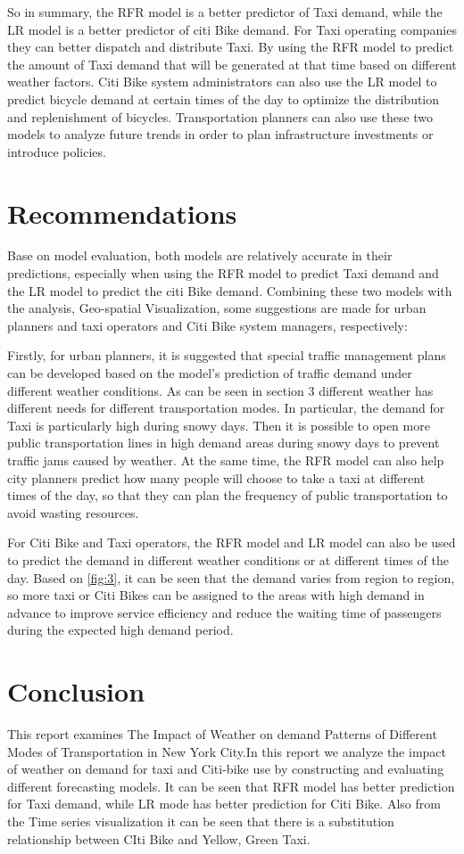 \documentclass[11pt]{article}
\begin{document}
So in summary, the RFR model is a better predictor of Taxi demand, while the LR model is a better predictor of citi Bike demand. For Taxi operating companies they can better dispatch and distribute Taxi. By using the RFR model to predict the amount of Taxi demand that will be generated at that time based on different weather factors. Citi Bike system administrators can also use the LR model to predict bicycle demand at certain times of the day to optimize the distribution and replenishment of bicycles. Transportation planners can also use these two models to analyze future trends in order to plan infrastructure investments or introduce policies.

\section{Recommendations}
Base on model evaluation, both models are relatively accurate in their predictions, especially when using the RFR model to predict Taxi demand and the LR model to predict the citi Bike demand. Combining these two models with the analysis, Geo-spatial Visualization, some suggestions are made for urban planners and taxi operators and Citi Bike system managers, respectively:

Firstly, for urban planners, it is suggested that special traffic management plans can be developed based on the model's prediction of traffic demand under different weather conditions. As can be seen in section 3 different weather has different needs for different transportation modes. In particular, the demand for Taxi is particularly high during snowy days. Then it is possible to open more public transportation lines in high demand areas during snowy days to prevent traffic jams caused by weather. At the same time, the RFR model can also help city planners predict how many people will choose to take a taxi at different times of the day, so that they can plan the frequency of public transportation to avoid wasting resources.

For Citi Bike and Taxi operators, the RFR model and LR model can also be used to predict the demand in different weather conditions or at different times of the day. Based on \ref{fig:3}, it can be seen that the demand varies from region to region, so more taxi or Citi Bikes can be assigned to the areas with high demand in advance to improve service efficiency and reduce the waiting time of passengers during the expected high demand period.

\section{Conclusion}
This report examines The Impact of Weather on demand Patterns of Different Modes of Transportation in New York City.In this report we analyze the impact of weather on demand for taxi and Citi-bike use by constructing and evaluating different forecasting models. It can be seen that RFR model has better prediction for Taxi demand, while LR mode has better prediction for Citi Bike. Also from the Time series visualization it can be seen that there is a substitution relationship between CIti Bike and Yellow, Green Taxi.
\end{document}

